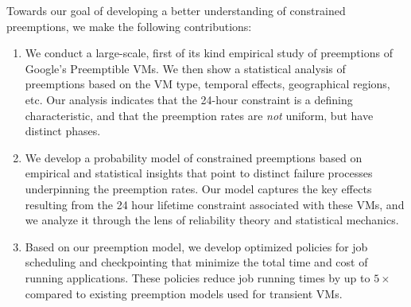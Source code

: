 Towards our goal of developing a better understanding of constrained preemptions, we make the following contributions:
\begin{enumerate} [leftmargin=12pt]

\item We conduct a large-scale, first of its kind empirical study of preemptions of Google's Preemptible VMs. We then show a statistical analysis of preemptions based on the VM type, temporal effects, geographical regions, etc. Our analysis 
  indicates that the 24-hour constraint is a defining characteristic, and that the preemption rates are \emph{not} uniform, but have distinct phases. 

\item We develop a probability model of constrained preemptions based on empirical and statistical insights that point to distinct failure processes underpinning the preemption rates. Our model captures the key effects resulting from the 24 hour lifetime constraint associated with these VMs, and we analyze it through the lens of reliability theory and statistical mechanics. 


\item Based on our preemption model, we develop optimized policies for job scheduling and checkpointing that minimize the total time and cost of running applications. These policies reduce job running times by up to $5\times$ compared to existing preemption models used for transient VMs. 
  


\end{enumerate}
